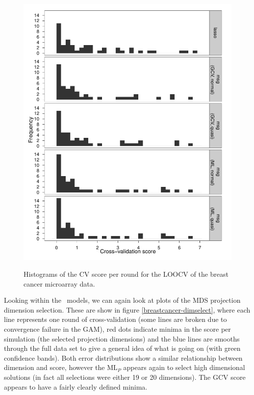 \begin{figure}
\centering
\includegraphics[width=6in]{gds/figs/breastcancer-cv-plot.pdf} \\
\caption{Histograms of the CV score per round for the LOOCV of the breast cancer microarray data.}
\label{breast-cancer-cv-plot}
\end{figure}

Looking within the \mdsds\ models, we can again look at plots of the MDS projection dimension selection. These are show in figure \ref{breastcancer-dimselect}, where each line represents one round of cross-validation (some lines are broken due to convergence failure in the GAM), red dots indicate minima in the score per simulation (the selected projection dimensions) and the blue lines are smooths through the full data set to give a general idea of what is going on (with green confidence bands). Both error distributions show a similar relationship between dimension and score, however the $\text{ML}_P$ appears again to select high dimensional solutions (in fact all selections were either 19 or 20 dimensions). The GCV score appears to have a fairly clearly defined minima. 

